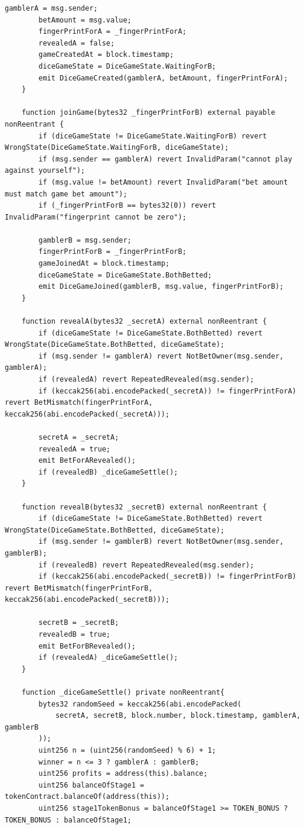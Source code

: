 \documentclass[10pt,a4paper]{article}
\begin{document}
\begin{lstlisting}[caption={Stage2.sol}]
        gamblerA = msg.sender;
        betAmount = msg.value;
        fingerPrintForA = _fingerPrintForA;
        revealedA = false;
        gameCreatedAt = block.timestamp;
        diceGameState = DiceGameState.WaitingForB;
        emit DiceGameCreated(gamblerA, betAmount, fingerPrintForA);
    }

    function joinGame(bytes32 _fingerPrintForB) external payable nonReentrant {
        if (diceGameState != DiceGameState.WaitingForB) revert WrongState(DiceGameState.WaitingForB, diceGameState);
        if (msg.sender == gamblerA) revert InvalidParam("cannot play against yourself");
        if (msg.value != betAmount) revert InvalidParam("bet amount must match game bet amount");
        if (_fingerPrintForB == bytes32(0)) revert InvalidParam("fingerprint cannot be zero");
      
        gamblerB = msg.sender;
        fingerPrintForB = _fingerPrintForB;
        gameJoinedAt = block.timestamp;
        diceGameState = DiceGameState.BothBetted;
        emit DiceGameJoined(gamblerB, msg.value, fingerPrintForB);
    }

    function revealA(bytes32 _secretA) external nonReentrant {
        if (diceGameState != DiceGameState.BothBetted) revert WrongState(DiceGameState.BothBetted, diceGameState);
        if (msg.sender != gamblerA) revert NotBetOwner(msg.sender, gamblerA);
        if (revealedA) revert RepeatedRevealed(msg.sender);
        if (keccak256(abi.encodePacked(_secretA)) != fingerPrintForA) revert BetMismatch(fingerPrintForA, keccak256(abi.encodePacked(_secretA)));
     
        secretA = _secretA;
        revealedA = true;
        emit BetForARevealed();
        if (revealedB) _diceGameSettle(); 
    }

    function revealB(bytes32 _secretB) external nonReentrant {
        if (diceGameState != DiceGameState.BothBetted) revert WrongState(DiceGameState.BothBetted, diceGameState);
        if (msg.sender != gamblerB) revert NotBetOwner(msg.sender, gamblerB);
        if (revealedB) revert RepeatedRevealed(msg.sender);
        if (keccak256(abi.encodePacked(_secretB)) != fingerPrintForB) revert BetMismatch(fingerPrintForB, keccak256(abi.encodePacked(_secretB)));
     
        secretB = _secretB;
        revealedB = true;
        emit BetForBRevealed();
        if (revealedA) _diceGameSettle(); 
    }

    function _diceGameSettle() private nonReentrant{
        bytes32 randomSeed = keccak256(abi.encodePacked(
            secretA, secretB, block.number, block.timestamp, gamblerA, gamblerB
        ));
        uint256 n = (uint256(randomSeed) % 6) + 1;
        winner = n <= 3 ? gamblerA : gamblerB;
        uint256 profits = address(this).balance;
        uint256 balanceOfStage1 = tokenContract.balanceOf(address(this));
        uint256 stage1TokenBonus = balanceOfStage1 >= TOKEN_BONUS ? TOKEN_BONUS : balanceOfStage1;


\end{lstlisting}
\end{document}
